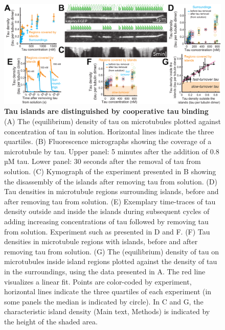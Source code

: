 \begin{figure}[h]
\centering
\includegraphics[width=1\linewidth]{Figures/tau_flushouts.png}
\caption[Tau islands are distinguished by cooperative tau binding.]{
\textbf{Tau islands are distinguished by cooperative tau binding} (A) The (equilibrium) density of tau on microtubules plotted against concentration of tau in solution. Horizontal lines indicate the three quartiles. (B) Fluorescence micrographs showing the coverage of a microtubule by tau. Upper panel: 5 minutes after the addition of 0.8 µM tau. Lower panel: 30 seconds after the removal of tau from solution. (C) Kymograph of the experiment presented in B showing the disassembly of the islands after removing tau from solution. (D) Tau densities in microtubule regions surrounding islands, before and after removing tau from solution. (E) Exemplary time-traces of tau density outside and inside the islands during subsequent cycles of adding increasing concentrations of tau followed by removing tau from solution. Experiment such as presented in D and F. (F) Tau densities in microtubule regions with islands, before and after removing tau from solution. (G) The (equilibrium) density of tau on microtubules inside island regions plotted against the density of tau in the surroundings, using the data presented in A. The red line visualizes a linear fit. Points are color-coded by experiment, horizontal lines indicate the three quartiles of each experiment (in some panels the median is indicated by circle). In C and G, the characteristic island density (Main text, Methods) is indicated by the height of the shaded area.
	}\label{tauflushouts}
\end{figure}

